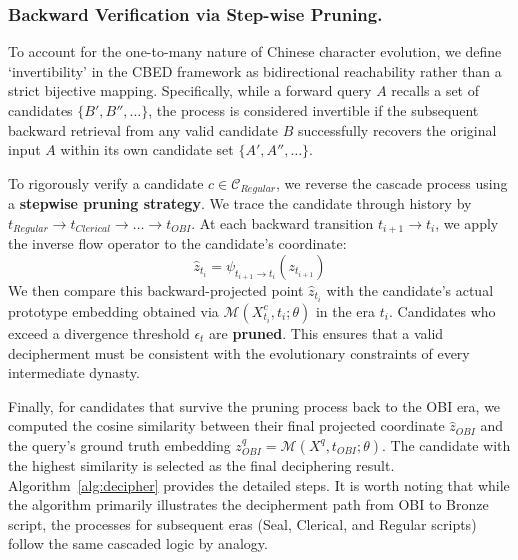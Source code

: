 \documentclass{article}
\begin{document}
\subsubsection{Backward Verification via Step-wise Pruning.} 
\label{sec:backward_verification}
To account for the one-to-many nature of Chinese character evolution, we define `invertibility' in the CBED framework as bidirectional reachability rather than a strict bijective mapping. Specifically, while a forward query $A$ recalls a set of candidates $\{B', B'', \dots\}$, the process is considered invertible if the subsequent backward retrieval from any valid candidate $B$ successfully recovers the original input $A$ within its own candidate set $\{A', A'', \dots\}$.

To rigorously verify a candidate $c \in \mathcal{C}_{Regular}$, we reverse the cascade process using a \textbf{stepwise pruning strategy}. We trace the candidate through history by $t_{Regular} \to t_{Clerical} \to \dots \to t_{OBI}$. At each backward transition $t_{i+1} \to t_{i}$, we apply the inverse flow operator to the candidate's coordinate:
\begin{equation}
    \hat{z}_{t_i} = \psi_{t_{i+1} \to t_{i}}(z_{t_{i+1}})
\end{equation}
We then compare this backward-projected point $\hat{z}_{t_i}$ with the candidate's actual prototype embedding obtained via $\mathcal{M}(X^{c}_{t_i}, t_i; \theta)$ in the era $t_i$. Candidates who exceed a divergence threshold $\epsilon_{t}$ are \textbf{pruned}. This ensures that a valid decipherment must be consistent with the evolutionary constraints of every intermediate dynasty.

Finally, for candidates that survive the pruning process back to the OBI era, we computed the cosine similarity between their final projected coordinate $\hat{z}_{OBI}$ and the query's ground truth embedding $z_{OBI}^q = \mathcal{M}(X^q, t_{OBI}; \theta)$. The candidate with the highest similarity is selected as the final deciphering result. Algorithm~\ref{alg:decipher} provides the detailed steps. It is worth noting that while the algorithm primarily illustrates the decipherment path from OBI to Bronze script, the processes for subsequent eras (Seal, Clerical, and Regular scripts) follow the same cascaded logic by analogy.
\end{document}
